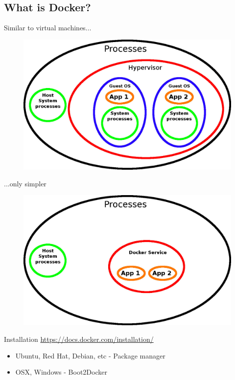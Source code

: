 \documentclass{beamer}
\begin{document}
    \subsection{What is Docker?}
    \begin{frame}{Similar to virtual machines...}
        \begin{figure}[htpb]
            \centering
            \includegraphics[width=0.8\linewidth]{VM.jpg}
        \end{figure}
    \end{frame}
    \begin{frame}{...only simpler}
        \begin{figure}[htpb]
            \centering
            \includegraphics[width=0.8\linewidth]{Docker.jpg}
        \end{figure}
    \end{frame}
    \begin{frame}{Installation}
        \href{https://docs.docker.com/installation/}{https://docs.docker.com/installation/}
        \begin{itemize}
            \item Ubuntu, Red Hat, Debian, etc - Package manager
            \item OSX, Windows - Boot2Docker
        \end{itemize}
    \end{frame}
\end{document}
